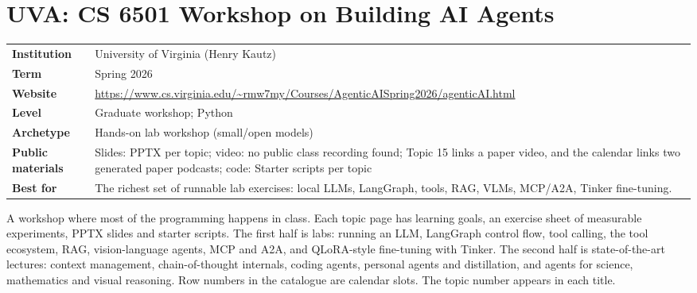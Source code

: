 \documentclass[10pt,oneside]{report}
\begin{document}
\chapter{UVA: CS 6501 Workshop on Building AI Agents}\hypertarget{course-UVA}{}
{\small\begin{tabularx}{\linewidth}{@{}>{\bfseries}l X@{}}\toprule
Institution & University of Virginia (Henry Kautz)\\
Term & Spring 2026\\
Website & \href{https://www.cs.virginia.edu/\%7Ermw7my/Courses/AgenticAISpring2026/agenticAI.html}{https://www.cs.virginia.edu/\textasciitilde{}rmw7my/Courses/AgenticAISpring2026/agenticAI.html}\\
Level & Graduate workshop; Python\\
Archetype & Hands-on lab workshop (small/open models)\\
Public materials & Slides: PPTX per topic; video: no public class recording found; Topic 15 links a paper video, and the calendar links two generated paper podcasts; code: Starter scripts per topic\\
Best for & The richest set of runnable lab exercises: local LLMs, LangGraph, tools, RAG, VLMs, MCP/A2A, Tinker fine-tuning.\\
\bottomrule\end{tabularx}}

A workshop where most of the programming happens in class.
Each topic page has learning goals, an exercise sheet of measurable experiments, PPTX slides and starter scripts.
The first half is labs: running an LLM, LangGraph control flow, tool calling, the tool ecosystem, RAG, vision-language agents, MCP and A2A, and QLoRA-style fine-tuning with Tinker.
The second half is state-of-the-art lectures: context management, chain-of-thought internals, coding agents, personal agents and distillation, and agents for science, mathematics and visual reasoning.
Row numbers in the catalogue are calendar slots. The topic number appears in each title.
\end{document}
